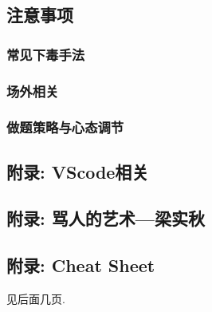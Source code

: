 \documentclass[a4paper, twoside]{article}
\begin{document}
\begin{multicols}{2}
			\subsection{注意事项}

				\subsubsection{常见下毒手法}
					

				\subsubsection{场外相关}
					

				\subsubsection{做题策略与心态调节}
					
			
			\subsection{附录: VScode相关}
				
			
			\newpage
			\subsection{附录: 骂人的艺术—梁实秋}
				

	\end{multicols}
			
	\subsection{附录: Cheat Sheet}
		见后面几页.

	

	

	

	\pagestyle{empty}

	\newpage

	\null


\end{document}

